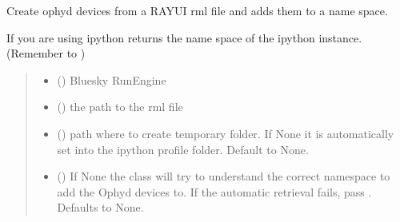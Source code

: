 \documentclass[letterpaper,10pt,english]{sphinxmanual}
\begin{document}
\begin{fulllineitems}
\label{\detokenize{API:raypyng_bluesky.RaypyngOphydDevices.RaypyngOphydDevices}}
\pysigstartsignatures
{}
\pysigstopsignatures
\sphinxAtStartPar
Create ophyd devices from a RAY\sphinxhyphen{}UI rml file and adds them to a name space.

\sphinxAtStartPar
If you are using ipython  returns the name space of the ipython instance.
(Remember to )
\begin{quote}\begin{description}
\begin{itemize}
\item {} 
\sphinxAtStartPar
{} () \textendash{} Bluesky RunEngine

\item {} 
\sphinxAtStartPar
{} () \textendash{} the path to the rml file

\item {} 
\sphinxAtStartPar
{} () \textendash{} path where to create temporary folder. If None it is automatically
set into the ipython profile folder. Default to None.

\item {} 
\sphinxAtStartPar
{} (\sphinxstyleliteralemphasis{\sphinxupquote{, }}) \textendash{} If None the class will try to understand the correct namespace to add the Ophyd devices to.
If the automatic retrieval fails, pass . Defaults to None.


\end{itemize}
\end{description}
\end{quote}
\end{fulllineitems}
\end{document}
